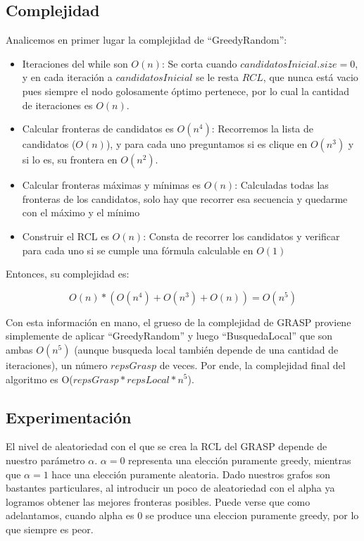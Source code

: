 \subsection{Complejidad}

Analicemos en primer lugar la complejidad de ``GreedyRandom'':
\begin{itemize}
    \item Iteraciones del while son $O(n)$: Se corta cuando $candidatosInicial.size = 0$, y en cada iteración a $candidatosInicial$ se le resta $RCL$, que nunca está vacio pues siempre el nodo golosamente óptimo pertenece, por lo cual la cantidad de iteraciones es $O(n)$.
    \item Calcular fronteras de candidatos es $O(n^4)$: Recorremos la lista de candidatos ($O(n)$), y para cada uno preguntamos si es clique en $O(n^3)$ y si lo es, su frontera en $O(n^2)$.
    \item Calcular fronteras máximas y mínimas es $O(n)$: Calculadas todas las fronteras de los candidatos, solo hay que recorrer esa secuencia y quedarme con el máximo y el mínimo
    \item Construir el RCL es $O(n)$: Consta de recorrer los candidatos y verificar para cada uno si se cumple una fórmula calculable en $O(1)$
\end{itemize}

Entonces, su complejidad es:

$$ O(n) * (O(n^4) + O(n^3) + O(n)) = O(n^5)$$

Con esta información en mano, el grueso de la complejidad de GRASP proviene simplemente de aplicar ``GreedyRandom'' y luego ``BusquedaLocal'' que son ambas $O(n^5)$ (aunque busqueda local también depende de una cantidad de iteraciones), un número $repsGrasp$ de veces. Por ende, la complejidad final del algoritmo es O($repsGrasp * repsLocal * n^5$).


\subsection{Experimentación}

El nivel de aleatoriedad con el que se crea la RCL del GRASP depende de nuestro parámetro $\alpha$. $\alpha = 0$ representa una elección puramente greedy, mientras que $\alpha = 1$ hace una elección puramente aleatoria. Dado nuestros grafos son bastantes particulares, al introducir un poco de aleatoriedad con el alpha ya logramos obtener las mejores fronteras posibles. Puede verse que como adelantamos, cuando alpha es 0 se produce una eleccion puramente greedy, por lo que siempre es peor. \\


